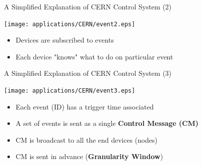 \documentclass[compress,red]{beamer}
\begin{document}
\begin{frame}{A Simplified Explanation of CERN Control System (2)}

      \begin{center}
      \texttt{[image: applications/CERN/event2.eps]}
      \end{center}

  \begin{itemize}
    \item Devices are subscribed to events 
    \item Each device "knows" what to do on particular event
  \end{itemize}


\end{frame}


\begin{frame}{A Simplified Explanation of CERN Control System (3)}

      \begin{center}
      \texttt{[image: applications/CERN/event3.eps]}
      \end{center}

  \begin{itemize}
    \item Each event (ID) has a trigger time associated
	\item A set of events is sent as a single {\bf Control Message (CM)}
	\item CM is broadcast to all the end devices (nodes)
	\item CM is sent in advance ({\bf Granularity Window})
  \end{itemize}

\end{frame}
\end{document}
